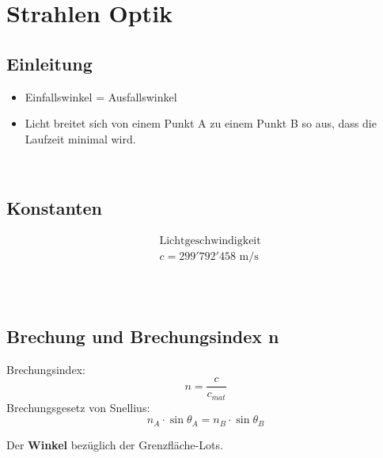 



\chapter{Strahlen Optik}

\section{Einleitung}
\begin{itemize}
	\item Einfallswinkel = Ausfallswinkel 
	\item Licht breitet sich von einem Punkt A zu einem Punkt B so aus, dass die Laufzeit minimal wird. \\
\end{itemize}
\
\section{Konstanten}
\[
\boxed{\begin{aligned}	
		&\text{Lichtgeschwindigkeit} \\
		&c = 299'792'458\text{ m/s}\\
	\end{aligned}}	\]
\\
\\
\section{Brechung und Brechungsindex n}
Brechungsindex: 
\[
	n= \frac{c}{c_{mat}}
\]
Brechungsgesetz von Snellius: 
\[
	n_A \cdot \sin \theta_A = n_B\cdot \sin \theta_B
\]

\begin{footnotesize}
	Der \textbf{Winkel} bezüglich der Grenzfläche-Lots.
\end{footnotesize}
\\
\\

